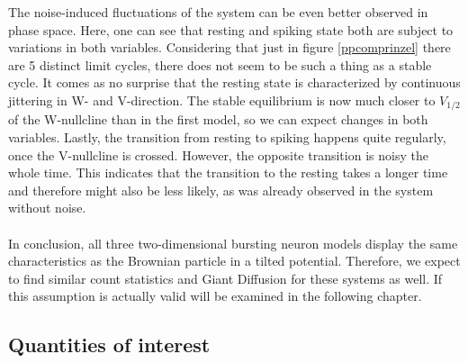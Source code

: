 \documentclass[12pt,a4paper]{article}
\begin{document}
The noise-induced fluctuations of the system can be even better observed in phase space. Here, one can see that resting and spiking state both are subject to variations in both variables. Considering that just in figure \ref{ppcomprinzel} there are 5 distinct limit cycles, there does not seem to be such a thing as a stable cycle. It comes as no surprise that the resting state is characterized by continuous jittering in W- and V-direction. The stable equilibrium is now much closer to $V_{1/2}$ of the W-nullcline than in the first model, so we can expect changes in both variables. Lastly, the transition from resting to spiking happens quite regularly, once the V-nullcline is crossed. However, the opposite transition is noisy the whole time. This indicates that the transition to the resting takes a longer time and therefore might also be less likely, as was already observed in the system without noise.\\\\
In conclusion, all three two-dimensional bursting neuron models display the same characteristics as the Brownian particle in a tilted potential. Therefore, we expect to find similar count statistics and Giant Diffusion for these systems as well. If this assumption is actually valid will be examined in the following chapter.
\subsection{Quantities of interest}\label{quant}
\end{document}
